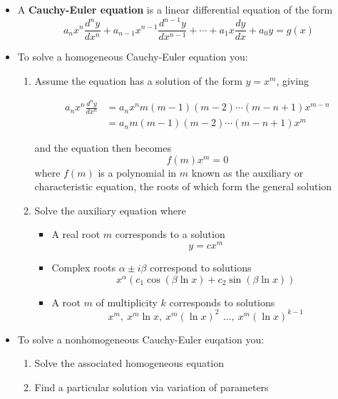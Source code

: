 \documentclass{article}
\begin{document}
\begin{itemize}
  \item A \textbf{Cauchy-Euler equation} is a linear differential equation of the form \[a_n x^n \frac{d^n y}{dx^n} + a_{n - 1} x^{n - 1} \frac{d^{n - 1} y}{dx^{n - 1}} + \cdots + a_1 x \frac{dy}{dx} + a_0 y = g(x)\]

  \item To solve a homogeneous Cauchy-Euler equation you:

        \begin{enumerate}
          \item Assume the equation has a solution of the form $y = x^m$, giving

                \begin{align*}
                  a_n x^n \frac{d^n y}{dx^n} & = a_n x^n m (m - 1) (m - 2) \cdots (m - n + 1) x^{m - n} \\
                                             & = a_n m (m - 1) (m - 2) \cdots (m - n + 1) x^m
                \end{align*}

                and the equation then becomes \[f(m) x^m = 0\] where $f(m)$ is a polynomial in $m$ known as the auxiliary or characteristic equation, the roots of which form the general solution

          \item Solve the auxiliary equation where

                \begin{itemize}
                  \item A real root $m$ corresponds to a solution \[y = c x^m\]

                  \item Complex roots $\alpha \pm i \beta$ correspond to solutions \[x^\alpha (c_1 \cos (\beta \ln x) + c_2 \sin (\beta \ln x))\]

                  \item A root $m$ of multiplicity $k$ corresponds to solutions \[x^m, \: x^m \ln x, \: x^m (\ln x)^2\, \:\ldots, \: x^m (\ln x)^{k - 1}\]
                \end{itemize}
        \end{enumerate}

  \item To solve a nonhomogeneous Cauchy-Euler euqation you:

        \begin{enumerate}
          \item Solve the associated homogeneous equation

          \item Find a particular solution via variation of parameters
        \end{enumerate}
\end{itemize}
\end{document}
